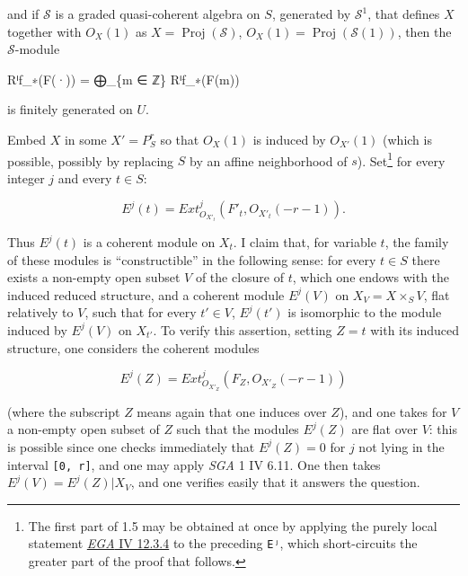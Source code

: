 \documentclass[
  11pt,
  a4paper,
]{book}
\newenvironment{Shaded}{}{}
\newcommand{\NormalTok}[1]{#1}
\begin{document}
and if \(\mathcal{S}\) is a graded quasi-coherent algebra on \(S\),
generated by \(\mathcal{S}^{1}\), that defines \(X\) together with
\(O_{X}(1)\) as \(X = \operatorname{Proj}(\mathcal{S})\),
\(O_{X}(1) = \operatorname{Proj}(\mathcal{S}(1))\), then the
\(\mathcal{S}\)-module

\begin{Shaded}
\begin{Highlighting}[]
\NormalTok{Rⁱf\_∗(F(·)) = ⨁\_\{m ∈ ℤ\} Rⁱf\_∗(F(m))}
\end{Highlighting}
\end{Shaded}

is finitely generated on \(U\).

Embed \(X\) in some \(X' = P^{r}_{S}\) so that \(O_{X}(1)\) is induced
by \(O_{X'}(1)\) (which is possible, possibly by replacing \(S\) by an
affine neighborhood of \(s\)). Set\footnote{The first part of 1.5 may be
  obtained at once by applying the purely local statement
  \href{https://jcreinhold.github.io/ega/iv/24-ch4-12-study-of-fibers.html\#123-local-cohomological-properties-of-the-fibres-of-a-flat-morphism-locally-of-finite-presentation}{\emph{EGA}
  IV 12.3.4} to the preceding \texttt{Eʲ}, which short-circuits the
  greater part of the proof that follows.} for every integer \(j\) and
every \(t \in S\):

\[ E^{j}(t) = Ext^{j}_{O_{X'_{t}}}(F'_{t}, O_{X'_{t}}(-r - 1)). \]

Thus \(E^{j}(t)\) is a coherent module on \(X_{t}\). I claim that, for
variable \(t\), the family of these modules is ``constructible'' in the
following sense: for every \(t \in S\) there exists a non-empty open
subset \(V\) of the closure of \(t\), which one endows with the induced
reduced structure, and a coherent module \(E^{j}(V)\) on
\(X_{V} = X \times_{S} V\), flat relatively to \(V\), such that for
every \(t' \in V\), \(E^{j}(t')\) is isomorphic to the module induced by
\(E^{j}(V)\) on \(X_{t'}\). To verify this assertion, setting
\(Z = {t}\) with its induced structure, one considers the coherent
modules

\[ E^{j}(Z) = Ext^{j}_{O_{X'_{Z}}}(F_{Z}, O_{X'_{Z}}(-r - 1)) \]

(where the subscript \(Z\) means again that one induces over \(Z\)), and
one takes for \(V\) a non-empty open subset of \(Z\) such that the
modules \(E^{j}(Z)\) are flat over \(V\): this is possible since one
checks immediately that \(E^{j}(Z) = 0\) for \(j\) not lying in the
interval \texttt{{[}0,\ r{]}}, and one may apply \emph{SGA} 1 IV 6.11.
One then takes \(E^{j}(V) =
E^{j}(Z)|X_{V}\), and one verifies easily that it answers the question.
\end{document}
